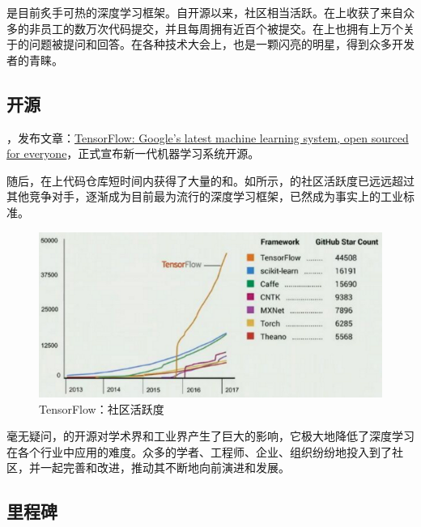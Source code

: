 \begin{content}

\tf{}是目前炙手可热的深度学习框架。自开源以来，\tf{}社区相当活跃。在上收获了来自众多的非员工的数万次代码提交，并且每周拥有近百个被提交。在上也拥有上万个关于\tf{}的问题被提问和回答。在各种技术大会上，\tf{}也是一颗闪亮的明星，得到众多开发者的青睐。

\subsection{开源}

，发布文章：\href{https://research.googleblog.com/2015/11/tensorflow-googles-latest-machine\_9.html}{TensorFlow: Google's latest machine learning system, open sourced for everyone}，正式宣布新一代机器学习系统开源。

随后，在上代码仓库短时间内获得了大量的和。如所示，的社区活跃度已远远超过其他竞争对手，逐渐成为目前最为流行的深度学习框架，已然成为事实上的工业标准。

\begin{figure}[H]
\centering
\includegraphics[width=1.0\textwidth]{figures/tf-commits.png}
\caption{TensorFlow：社区活跃度}
 \label{fig:tf-commits}
\end{figure}

毫无疑问，的开源对学术界和工业界产生了巨大的影响，它极大地降低了深度学习在各个行业中应用的难度。众多的学者、工程师、企业、组织纷纷地投入到了社区，并一起完善和改进，推动其不断地向前演进和发展。

\subsection{里程碑}


\end{content}
